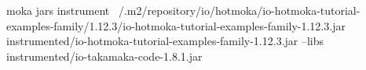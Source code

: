 \begin{shellcommandbox}\begin{ttlst}
moka jars instrument ~/.m2/repository/io/hotmoka/io-hotmoka-tutorial-examples-family/1.12.3/io-hotmoka-tutorial-examples-family-1.12.3.jar instrumented/io-hotmoka-tutorial-examples-family-1.12.3.jar --libs instrumented/io-takamaka-code-1.8.1.jar
\end{ttlst}\end{shellcommandbox}
